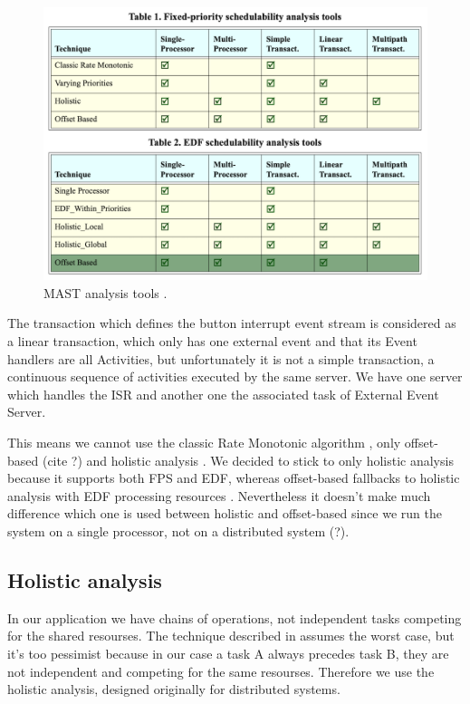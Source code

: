 \documentclass{article}
\begin{document}
\begin{figure}[!htbp]
\centering
\includegraphics[width=5in]{images/mast-analysis}
\caption{MAST analysis tools \cite{mast-description}.}
\label{mast-analysis-tools}
\end{figure}

The transaction which defines the button interrupt event stream is considered as a linear transaction, which only has one external event and that its Event handlers are all Activities, but unfortunately it is not a simple transaction, a continuous sequence of activities executed by the same server. We have one server which handles the ISR and another one the associated task of External Event Server.

This means we cannot use the classic Rate Monotonic algorithm \cite{rm-dm}, only offset-based (cite ?) and holistic analysis \cite{holistic-analysis}. We decided to stick to only holistic analysis because it supports both FPS and EDF, whereas offset-based fallbacks to holistic analysis with EDF processing resources \cite{mast-readme}. Nevertheless it doesn't make much difference which one is used between holistic and offset-based since we run the system on a single processor, not on a distributed system (?).

\subsection{Holistic analysis}

In our application we have chains of operations, not independent tasks competing for the shared resourses. The technique described in \cite{practitioner-common-data} assumes the worst case, but it's too pessimist because in our case a task A always precedes task B, they are not independent and competing for the same resourses. Therefore we use the holistic analysis, designed originally for distributed systems.
\end{document}
